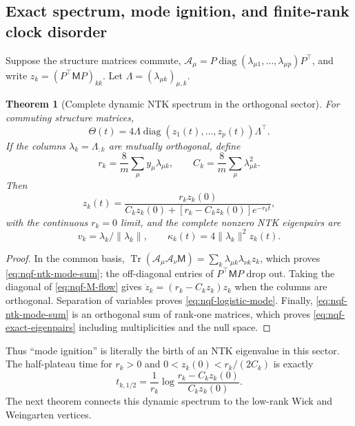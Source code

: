\documentclass{article}
\newtheorem{theorem}{Theorem}[section]
\newcommand{\Tr}{\operatorname{Tr}}
\newcommand{\diag}{\operatorname{diag}}
\begin{document}
\subsection{Exact spectrum, mode ignition, and finite-rank clock disorder}

Suppose the structure matrices commute,
\(\mathscr A_\mu=P\diag(\lambda_{\mu1},\ldots,\lambda_{\mu p})P^\top\),
and write \(z_k=(P^\top\mathsf MP)_{kk}\).  Let
\(\Lambda=(\lambda_{\mu k})_{\mu,k}\).

\begin{theorem}[Complete dynamic NTK spectrum in the orthogonal sector]
\label{thm:nqf-spectrum}
For commuting structure matrices,
\begin{equation}
\Theta(t)=4\Lambda\diag(z_1(t),\ldots,z_p(t))\Lambda^\top.
\label{eq:nqf-ntk-mode-sum}
\end{equation}
If the columns \(\lambda_k=\Lambda_{:k}\) are mutually orthogonal, define
\begin{equation}
r_k=\frac8m\sum_\mu y_\mu\lambda_{\mu k},
\qquad
C_k=\frac8m\sum_\mu\lambda_{\mu k}^2.
\label{eq:nqf-mode-rates}
\end{equation}
Then
\begin{equation}
z_k(t)=\frac{r_kz_k(0)}{C_kz_k(0)+[r_k-C_kz_k(0)]e^{-r_kt}},
\label{eq:nqf-logistic-mode}
\end{equation}
with the continuous \(r_k=0\) limit, and the complete nonzero NTK
eigenpairs are
\begin{equation}
v_k=\lambda_k/\|\lambda_k\|,
\qquad
\kappa_k(t)=4\|\lambda_k\|^2z_k(t).
\label{eq:nqf-exact-eigenpairs}
\end{equation}
\end{theorem}

\begin{proof}
In the common basis,
\(\Tr(\mathscr A_\mu\mathscr A_\nu\mathsf M)
=\sum_k\lambda_{\mu k}\lambda_{\nu k}z_k\), which proves
\eqref{eq:nqf-ntk-mode-sum}; the off-diagonal entries of
\(P^\top\mathsf MP\) drop out.  Taking the diagonal of
\eqref{eq:nqf-M-flow} gives
\(\dot z_k=(r_k-C_kz_k)z_k\) when the columns are orthogonal.  Separation of
variables proves \eqref{eq:nqf-logistic-mode}.  Finally,
\eqref{eq:nqf-ntk-mode-sum} is an orthogonal sum of rank-one matrices, which
proves \eqref{eq:nqf-exact-eigenpairs} including multiplicities and the null
space.
\end{proof}

Thus ``mode ignition'' is literally the birth of an NTK eigenvalue in this
sector.  The half-plateau time for \(r_k>0\) and
\(0<z_k(0)<r_k/(2C_k)\) is exactly
\begin{equation}
t_{k,1/2}=\frac1{r_k}
\log\frac{r_k-C_kz_k(0)}{C_kz_k(0)}.
\label{eq:nqf-half-clock}
\end{equation}
The next theorem connects this dynamic spectrum to the low-rank Wick and
Weingarten vertices.
\end{document}
